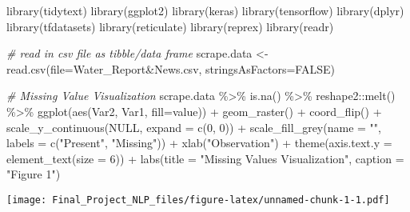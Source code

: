 \documentclass[
]{article}
\newenvironment{Shaded}{\begin{snugshade}}{\end{snugshade}}
\newcommand{\AttributeTok}[1]{\textcolor[rgb]{0.77,0.63,0.00}{#1}}
\newcommand{\CommentTok}[1]{\textcolor[rgb]{0.56,0.35,0.01}{\textit{#1}}}
\newcommand{\ConstantTok}[1]{\textcolor[rgb]{0.00,0.00,0.00}{#1}}
\newcommand{\DecValTok}[1]{\textcolor[rgb]{0.00,0.00,0.81}{#1}}
\newcommand{\FunctionTok}[1]{\textcolor[rgb]{0.00,0.00,0.00}{#1}}
\newcommand{\NormalTok}[1]{#1}
\newcommand{\OtherTok}[1]{\textcolor[rgb]{0.56,0.35,0.01}{#1}}
\newcommand{\SpecialCharTok}[1]{\textcolor[rgb]{0.00,0.00,0.00}{#1}}
\newcommand{\StringTok}[1]{\textcolor[rgb]{0.31,0.60,0.02}{#1}}
\begin{document}
\begin{Shaded}
\begin{Highlighting}[]
\FunctionTok{library}\NormalTok{(tidytext)}
\FunctionTok{library}\NormalTok{(ggplot2)}
\FunctionTok{library}\NormalTok{(keras)}
\FunctionTok{library}\NormalTok{(tensorflow)}
\FunctionTok{library}\NormalTok{(dplyr)}
\FunctionTok{library}\NormalTok{(tfdatasets)}
\FunctionTok{library}\NormalTok{(reticulate)}
\FunctionTok{library}\NormalTok{(reprex)}
\FunctionTok{library}\NormalTok{(readr)}

\CommentTok{\# read in csv file as tibble/data frame}
\NormalTok{scrape.data }\OtherTok{\textless{}{-}} \FunctionTok{read.csv}\NormalTok{(}\AttributeTok{file=}\StringTok{\textquotesingle{}Water\_Report\&News.csv\textquotesingle{}}\NormalTok{, }\AttributeTok{stringsAsFactors=}\ConstantTok{FALSE}\NormalTok{)}

\CommentTok{\# Missing Value Visualization}
\NormalTok{scrape.data }\SpecialCharTok{\%\textgreater{}\%}
  \FunctionTok{is.na}\NormalTok{() }\SpecialCharTok{\%\textgreater{}\%}
\NormalTok{  reshape2}\SpecialCharTok{::}\FunctionTok{melt}\NormalTok{() }\SpecialCharTok{\%\textgreater{}\%}
  \FunctionTok{ggplot}\NormalTok{(}\FunctionTok{aes}\NormalTok{(Var2, Var1, }\AttributeTok{fill=}\NormalTok{value)) }\SpecialCharTok{+}
  \FunctionTok{geom\_raster}\NormalTok{() }\SpecialCharTok{+}
  \FunctionTok{coord\_flip}\NormalTok{() }\SpecialCharTok{+}
  \FunctionTok{scale\_y\_continuous}\NormalTok{(}\ConstantTok{NULL}\NormalTok{, }\AttributeTok{expand =} \FunctionTok{c}\NormalTok{(}\DecValTok{0}\NormalTok{, }\DecValTok{0}\NormalTok{)) }\SpecialCharTok{+}
  \FunctionTok{scale\_fill\_grey}\NormalTok{(}\AttributeTok{name =} \StringTok{""}\NormalTok{,}
                  \AttributeTok{labels =} \FunctionTok{c}\NormalTok{(}\StringTok{"Present"}\NormalTok{,}
                             \StringTok{"Missing"}\NormalTok{)) }\SpecialCharTok{+}
  \FunctionTok{xlab}\NormalTok{(}\StringTok{"Observation"}\NormalTok{) }\SpecialCharTok{+}
  \FunctionTok{theme}\NormalTok{(}\AttributeTok{axis.text.y  =} \FunctionTok{element\_text}\NormalTok{(}\AttributeTok{size =} \DecValTok{6}\NormalTok{)) }\SpecialCharTok{+}
  \FunctionTok{labs}\NormalTok{(}\AttributeTok{title =} \StringTok{"Missing Values Visualization"}\NormalTok{,}
       \AttributeTok{caption =} \StringTok{"Figure 1"}\NormalTok{)}
\end{Highlighting}
\end{Shaded}

\texttt{[image: Final\_Project\_NLP\_files/figure-latex/unnamed-chunk-1-1.pdf]}
\end{document}
